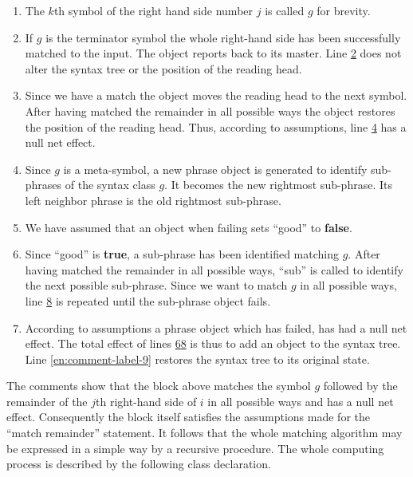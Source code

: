 \begin{enumerate}[leftmargin=*, itemindent=2.2\parindent, nosep, label=Line \arabic*.]
	\item The $k$th symbol of the right hand side number $j$ is called $g$ for brevity.
	\item If $g$ is the terminator symbol the whole right-hand side has been successfully matched to the input. The object reports back to its master. Line \hyperref[en:comment-label-2]{2} does not alter the syntax tree or the position of the reading head.

	\setcounter{enumi}{3}
	\item Since we have a match the object moves the reading head to the next symbol. After having matched the remainder in all possible ways the
	object restores the position of the reading head. Thus, according to assumptions, line \hyperref[en:comment-label-4]{4} has a null net effect. 
	
	\setcounter{enumi}{5}
	\item Since $g$ is a meta-symbol, a new phrase object is generated to identify sub-phrases of the syntax class $g$. It becomes the new rightmost sub-phrase. Its left neighbor phrase is the old rightmost sub-phrase.
	
	\item We have assumed that an object when failing sets ``good'' to \textbf{false}.
	
	\item Since ``good'' is \textbf{true}, a sub-phrase has been identified matching $g$. After having matched the remainder in all possible ways, ``sub'' is 	called to identify the next possible sub-phrase. Since we want to match $g$ in all possible ways, line \hyperref[en:comment-label-8]{8} is repeated until the sub-phrase object fails.
	
	\item According to assumptions a phrase object which has failed, has had a null net effect. The total effect of lines \hyperref[en:comment-label-6]{6}\textendash\hyperref[en:comment-label-8]{8} is thus to add an object to the syntax tree. Line \ref{en:comment-label-9} restores the syntax tree to its original state.
\end{enumerate}

The comments show that the block above matches the symbol $g$ followed by the remainder of the $j$th right-hand side of $i$ in all possible ways and has a null net effect. Consequently the block itself satisfies the assumptions made for the ``match remainder'' statement. It follows that the whole matching algorithm may be expressed in a simple way by a recursive procedure. The whole computing process is described by the following class declaration.

